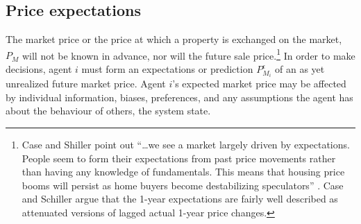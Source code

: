 \subsection{Price expectations}
The \gls{market price} or the price at which a property is exchanged on the market, $P_M$ will not be known in advance, nor will the future sale price.\footnote{Case and Shiller point out ``\dots we see a market largely driven by expectations. People seem to form their expectations from past price movements rather than having any knowledge of fundamentals. This means that housing price booms will persist as home buyers become destabilizing speculators''  \cite{caseThereBubbleHousing2003}. Case and Schiller\cite{caseThereBubbleHousing2003} argue that  the 1-year expectations are fairly well described as attenuated versions of lagged actual 1-year price changes.}  In order to make decisions, agent $i$ must form an \glspl{expectation} or prediction $P_{M_i}^{\epsilon}$ of an as yet unrealized future market price. Agent $i$'s expected market price may be affected by individual information, biases, preferences, and any assumptions the agent has about the behaviour of others, the system state.  




